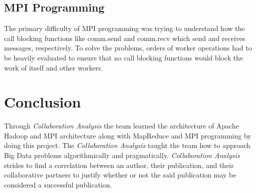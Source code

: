 \documentclass[10pt,journal,compsoc]{IEEEtran}
\begin{document}
\subsection{MPI Programming}
The primary difficulty of MPI programming was trying to understand how the call blocking functions like comm.send and comm.recv which send and receives messages, respectively. To solve the problems, orders of worker operations had to be heavily evaluated to ensure that no call blocking functions would block the work of itself and other workers.

\section{Conclusion}
Through \textit{Collaboration Analysis} the team learned the architecture of Apache Hadoop and MPI architecture along with MapReduce and MPI programming by doing this project. The \textit{Collaboration Analysis} taught the team how to approach Big Data problems algorithmically and pragmatically. \textit{Collaboration Analysis} strides to find a correlation between an author, their publication, and their collaborative partners to justify whether or not the said publication may be considered a successful publication.



%
\end{document}
